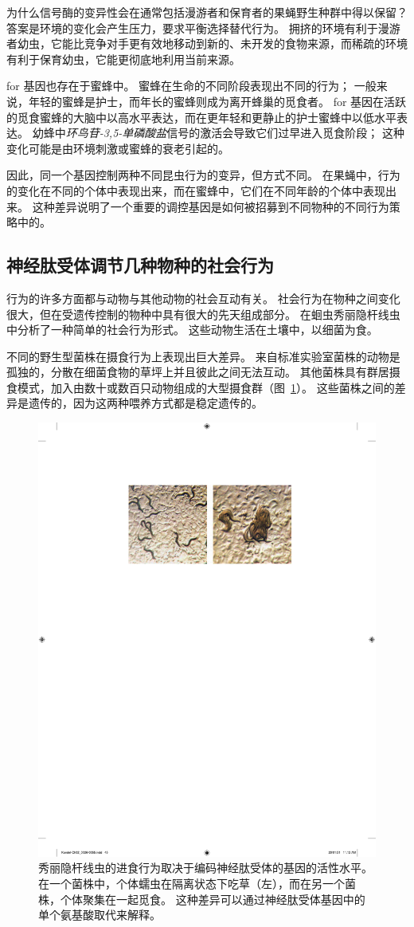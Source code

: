 为什么信号酶的变异性会在通常包括漫游者和保育者的果蝇野生种群中得以保留？
答案是环境的变化会产生压力，要求平衡选择替代行为。 
拥挤的环境有利于漫游者幼虫，它能比竞争对手更有效地移动到新的、未开发的食物来源，而稀疏的环境有利于保育幼虫，它能更彻底地利用当前来源。


for 基因也存在于蜜蜂中。
蜜蜂在生命的不同阶段表现出不同的行为；
一般来说，年轻的蜜蜂是护士，而年长的蜜蜂则成为离开蜂巢的觅食者。
for 基因在活跃的觅食蜜蜂的大脑中以高水平表达，而在更年轻和更静止的护士蜜蜂中以低水平表达。
幼蜂中\textit{环鸟苷-3,5-单磷酸盐}信号的激活会导致它们过早进入觅食阶段；
这种变化可能是由环境刺激或蜜蜂的衰老引起的。


因此，同一个基因控制两种不同昆虫行为的变异，但方式不同。
在果蝇中，行为的变化在不同的个体中表现出来，而在蜜蜂中，它们在不同年龄的个体中表现出来。
这种差异说明了一个重要的调控基因是如何被招募到不同物种的不同行为策略中的。



\subsection{神经肽受体调节几种物种的社会行为}

行为的许多方面都与动物与其他动物的社会互动有关。
社会行为在物种之间变化很大，但在受遗传控制的物种中具有很大的先天组成部分。
在蛔虫秀丽隐杆线虫中分析了一种简单的社会行为形式。 
这些动物生活在土壤中，以细菌为食。


不同的野生型菌株在摄食行为上表现出巨大差异。
来自标准实验室菌株的动物是孤独的，分散在细菌食物的草坪上并且彼此之间无法互动。
其他菌株具有群居摄食模式，加入由数十或数百只动物组成的大型摄食群（图~\ref{fig:2_15}）。
这些菌株之间的差异是遗传的，因为这两种喂养方式都是稳定遗传的。


\begin{figure}[htbp]
	\centering
	\includegraphics[width=0.5\linewidth]{chap02/fig_2_15}
	\caption{秀丽隐杆线虫的进食行为取决于编码神经肽受体的基因的活性水平。
		在一个菌株中，个体蠕虫在隔离状态下吃草（左），而在另一个菌株，个体聚集在一起觅食。
		这种差异可以通过神经肽受体基因中的单个氨基酸取代来解释\cite{de1998natural}。}
	\label{fig:2_15}
\end{figure}


